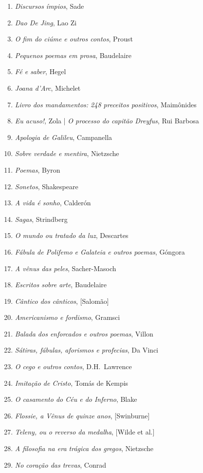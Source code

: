 \begin{enumerate}
\item \textit{Discursos ímpios}, Sade
\item \textit{Dao De Jing}, Lao Zi
\item \textit{O fim do ciúme e outros contos}, Proust
\item \textit{Pequenos poemas em prosa}, Baudelaire
\item \textit{Fé e saber}, Hegel
\item \textit{Joana d'Arc}, Michelet
\item \textit{Livro dos mandamentos: 248 preceitos positivos}, Maimônides
\item \textit{Eu acuso!}, Zola | \textit{O processo do capitão Dreyfus}, Rui Barbosa
\item \textit{Apologia de Galileu}, Campanella 
\item \textit{Sobre verdade e mentira}, Nietzsche
\item \textit{Poemas}, Byron
\item \textit{Sonetos}, Shakespeare
\item \textit{A vida é sonho}, Calderón
\item \textit{Sagas}, Strindberg
\item \textit{O mundo ou tratado da luz}, Descartes
\item \textit{Fábula de Polifemo e Galateia e outros poemas}, Góngora
\item \textit{A vênus das peles}, Sacher{}-Masoch
\item \textit{Escritos sobre arte}, Baudelaire
\item \textit{Cântico dos cânticos}, [Salomão]
\item \textit{Americanismo e fordismo}, Gramsci
\item \textit{Balada dos enforcados e outros poemas}, Villon
\item \textit{Sátiras, fábulas, aforismos e profecias}, Da Vinci
\item \textit{O cego e outros contos}, D.H.~Lawrence
\item \textit{Imitação de Cristo}, Tomás de Kempis
\item \textit{O casamento do Céu e do Inferno}, Blake
\item \textit{Flossie, a Vênus de quinze anos}, [Swinburne]
\item \textit{Teleny, ou o reverso da medalha}, [Wilde et al.]
\item \textit{A filosofia na era trágica dos gregos}, Nietzsche
\item \textit{No coração das trevas}, Conrad

\end{enumerate}
